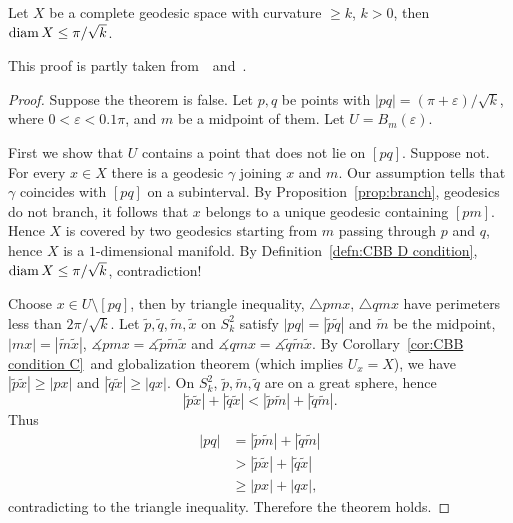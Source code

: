 \begin{thm}
    Let $X$ be a complete geodesic space with curvature $\geq k$, $k>0$, then $\operatorname{diam}{X}\leq\pi/\sqrt{k}$.
\end{thm}
This proof is partly taken from~\cite[Theorem 10.4.1]{buragoCourseMetricGeometry2001}~and~\cite[Theorem 6.2]{shiohamaIntroductionGeometry1993}.
\begin{proof}
    Suppose the theorem is false.
    Let $p,q$ be points with $|pq|=(\pi+\varepsilon)/\sqrt{k}$, where $0<\varepsilon<0.1\pi$, and $m$ be a midpoint of them.
    Let $U=B_m(\varepsilon)$.

    First we show that $U$ contains a point that does not lie on $[pq]$.
    Suppose not.
    For every $x\in X$ there is a geodesic $\gamma$ joining $x$ and $m$.
    Our assumption tells that $\gamma$ coincides with $[pq]$ on a subinterval.
    By Proposition~\ref{prop:branch}, geodesics do not branch, it follows that $x$ belongs to a unique geodesic containing $[pm]$.
    Hence $X$ is covered by two geodesics starting from $m$ passing through $p$ and $q$, hence $X$ is a $1$-dimensional manifold.
    By Definition~\ref{defn:CBB D condition}, $\operatorname{diam}{X}\leq\pi/\sqrt{k}$, contradiction!

    Choose $x\in U\setminus[pq]$, then by triangle inequality, $\triangle{pmx}$, $\triangle{qmx}$ have perimeters less than $2\pi/\sqrt{k}$.
    Let $\tilde{p},\tilde{q},\tilde{m},\tilde{x}$ on $S^2_k$ satisfy $|pq|=|\tilde{p}\tilde{q}|$ and $\tilde{m}$ be the midpoint, $|mx|=|\tilde{m}\tilde{x}|$, $\measuredangle{pmx}=\measuredangle{\tilde{p}\tilde{m}\tilde{x}}$ and $\measuredangle{qmx}=\measuredangle{\tilde{q}\tilde{m}\tilde{x}}$.
    By Corollary~\ref{cor:CBB condition C}~and globalization theorem (which implies $U_x=X$), we have $|\tilde{p}\tilde{x}|\geq|px|$ and $|\tilde{q}\tilde{x}|\geq|qx|$.
    On $S^2_k$, $\tilde{p},\tilde{m},\tilde{q}$ are on a great sphere, hence
    \[|\tilde{p}\tilde{x}|+|\tilde{q}\tilde{x}|<|\tilde{p}\tilde{m}|+|\tilde{q}\tilde{m}|.\]
    Thus
    \begin{align*}
        |pq|&=|\tilde{p}\tilde{m}|+|\tilde{q}\tilde{m}|\\
        &>|\tilde{p}\tilde{x}|+|\tilde{q}\tilde{x}|\\
        &\geq|px|+|qx|,
    \end{align*}
    contradicting to the triangle inequality.
    Therefore the theorem holds.
\end{proof}

